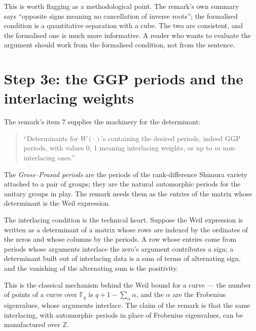 This is worth flagging as a methodological point. The remark's own summary
says ``opposite signs meaning no cancellation of inverse roots''; the
formalised condition is a quantitative separation with a cube. The two are
consistent, and the formalised one is much more informative. A reader who
wants to evaluate the argument should work from the formalised condition, not
from the sentence.

\section{Step 3e: the GGP periods and the interlacing weights}The remark's item 7 supplies the machinery for the determinant:

\begin{quote}
\small
``Determinants for $W(\cdot)$'s containing the desired periods, indeed GGP
periods, with values 0, 1 meaning interlacing weights, or up to $m$
non-interlacing ones.''
\end{quote}

The \emph{Gross--Prasad periods} are the periods of the rank-difference
Shimura variety attached to a pair of groups; they are the natural
automorphic periods for the unitary groups in play. The remark needs them as
the entries of the matrix whose determinant is the Weil expression.

The interlacing condition is the technical heart. Suppose the Weil expression
is written as a determinant of a matrix whose rows are indexed by the
ordinates of the zeros and whose columns by the periods. A row whose entries
come from periods whose arguments interlace the zero's argument contributes a
sign; a determinant built out of interlacing data is a sum of terms of
alternating sign, and the vanishing of the alternating sum is the positivity.

This is the classical mechanism behind the Weil bound for a curve --- the
number of points of a curve over $\mathbb{F}_q$ is $q + 1 - \sum_\alpha
\alpha$, and the $\alpha$ are the Frobenius eigenvalues, whose arguments
interlace. The claim of the remark is that the same interlacing, with
automorphic periods in place of Frobenius eigenvalues, can be manufactured over
$\mathbb{Z}$.

